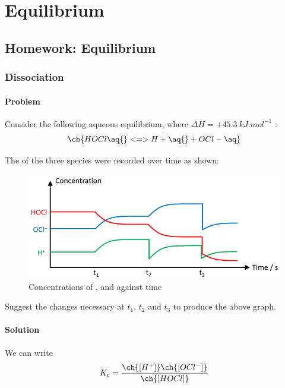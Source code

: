 \chapter{Equilibrium}
\section{Homework: Equilibrium}
\subsection{Dissociation}
\subsubsection{Problem}
Consider the following aqueous equilibrium,
where \(\Delta H = +\qty{45.3}{kJ.mol^{-1}}\)
:
\begin{equation}
	\ch{HOCl \aq{} <=> H+ \aq{} + OCl- \aq}
	\label{eq:hocl}
\end{equation}

The  of the three species were recorded over time as shown:
\begin{figure}[htpb]
	\centering
	\includegraphics[width=0.80\linewidth]{assets/07_hocl_concentrations.png}
	\caption{Concentrations of ,  and  against time}
	\label{fig:hocl}
\end{figure}

Suggest the changes necessary at \(t_1\), \(t_2\) and \(t_3\) to produce the
above graph.

\subsubsection{Solution}

We can write
\begin{equation}
	K_c = \frac{\ch{[H^{+}]} \ch{[OCl^-]}}{\ch{[HOCl]}}
	\label{eq:hocl-kc}
\end{equation}

